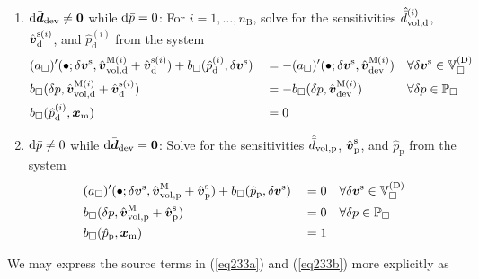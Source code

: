 \documentclass[10pt,a4paper]{article}
\newcommand{\ded}{\mathrm{d}}
\newcommand{\dep}{\mathrm{p}}
\begin{document}
\begin{enumerate}
\item $\operatorname{d \!}\bar{\boldsymbol{d}}_{\mathrm{dev}}\neq \boldsymbol{0}$ while $\operatorname{d \!}\bar{p}=0$: For $i=1,\ldots,n_{\mathrm{B}}$, solve for the sensitivities $\hat{\bar{d}}^{(i)}_{\vol,\ded}$, $\hat{\ta{v}}^{\fluct(i)}_\ded$, and $\hat{p}^{(i)}_\ded$ from the system
\begin{align}
    \label{eq233a} &
    (a_\Box)'(\bullet;\delta\ta{v}^\fluct,\hat{\ta{v}}^{\macro(i)}_{\vol,\ded}+\hat{\ta{v}}^{\fluct(i)}_\ded) +
    b_\Box(\hat{p}^{(i)}_\ded,\delta\ta{v}^\fluct)
    && =
    - (a_\Box)'(\bullet;\delta\ta{v}^\fluct,\hat{\ta{v}}^{\macro(i)}_\dev)
    && \forall \delta \ta{v}^\fluct\in\set{V}_\Box^{(\Dirichlet)}
 \\
    \label{eq233b} &
    b_\Box(\delta p,\hat{\ta{v}}^{\macro(i)}_{\vol,\ded}+\hat{\ta{v}}^{\fluct(i)}_\ded)
    && =
    - b_\Box(\delta p,\hat{\ta{v}}^{\macro(i)}_\dev)
    && \forall \delta p\in\set{P}_\Box
\\
    \label{eq233c} &
    b_\Box(\hat{p}^{(i)}_\ded,\ta{x}_\mean)
    && =
    0
    &&
\end{align}

\item $\operatorname{d \!}\bar{p}\neq 0$ while $\operatorname{d \!}\bar{\boldsymbol{d}}_{\mathrm{dev}}=\boldsymbol{0}$: Solve for the sensitivities $\hat{\bar{d}}_{\vol,\dep}$, $\hat{\ta{v}}^{\fluct}_\dep$, and $\hat{p}_\dep$ from the system
\begin{align}
    \label{eq243a} &
    (a_\Box)'(\bullet;\delta\ta{v}^\fluct,\hat{\ta{v}}^{\macro}_{\vol,\dep}+\hat{\ta{v}}^{\fluct}_\dep) +
    b_\Box(\hat{p}_\dep,\delta\ta{v}^\fluct)
    && =
    0
    && \forall \delta \ta{v}^\fluct\in\set{V}_\Box^{(\Dirichlet)}
 \\
    \label{eq243b} &
    b_\Box(\delta p,\hat{\ta{v}}^{\macro}_{\vol,\dep}+\hat{\ta{v}}^{\fluct}_\dep)
    && =
    0
    && \forall \delta p\in\set{P}_\Box
\\
    \label{eq243c} &
    b_\Box(\hat{p}_\dep,\ta{x}_\mean)
    && =
    1
    &&
\end{align}
\end{enumerate}
We may express the source terms in (\ref{eq233a}) and (\ref{eq233b}) more explicitly as
\end{document}
